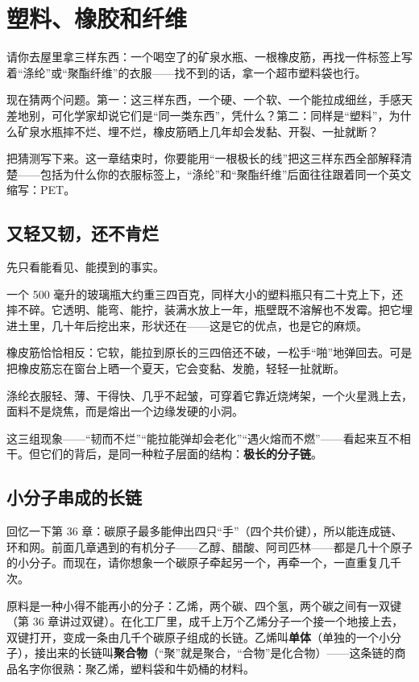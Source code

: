 \chapter{塑料、橡胶和纤维}

\begin{kaichang}
请你去屋里拿三样东西：一个喝空了的矿泉水瓶、一根橡皮筋，再找一件标签上写着“涤纶”或“聚酯纤维”的衣服——找不到的话，拿一个超市塑料袋也行。

现在猜两个问题。第一：这三样东西，一个硬、一个软、一个能拉成细丝，手感天差地别，可化学家却说它们是“同一类东西”，凭什么？第二：同样是“塑料”，为什么矿泉水瓶摔不烂、埋不烂，橡皮筋晒上几年却会发黏、开裂、一扯就断？

把猜测写下来。这一章结束时，你要能用“一根极长的线”把这三样东西全部解释清楚——包括为什么你的衣服标签上，“涤纶”和“聚酯纤维”后面往往跟着同一个英文缩写：PET。
\end{kaichang}

\section{又轻又韧，还不肯烂}

先只看能看见、能摸到的事实。

一个 500 毫升的玻璃瓶大约重三四百克，同样大小的塑料瓶只有二十克上下，还摔不碎。它透明、能弯、能拧，装满水放上一年，瓶壁既不溶解也不发霉。把它埋进土里，几十年后挖出来，形状还在——这是它的优点，也是它的麻烦。

橡皮筋恰恰相反：它软，能拉到原长的三四倍还不破，一松手“啪”地弹回去。可是把橡皮筋忘在窗台上晒一个夏天，它会变黏、发脆，轻轻一扯就断。

涤纶衣服轻、薄、干得快、几乎不起皱，可穿着它靠近烧烤架，一个火星溅上去，面料不是烧焦，而是熔出一个边缘发硬的小洞。

这三组现象——“韧而不烂”“能拉能弹却会老化”“遇火熔而不燃”——看起来互不相干。但它们的背后，是同一种粒子层面的结构：\textbf{极长的分子链}。

\section{小分子串成的长链}

回忆一下第 36 章：碳原子最多能伸出四只“手”（四个共价键），所以能连成链、环和网。前面几章遇到的有机分子——乙醇、醋酸、阿司匹林——都是几十个原子的小分子。而现在，请你想象一个碳原子牵起另一个，再牵一个，一直重复几千次。

原料是一种小得不能再小的分子：乙烯，两个碳、四个氢，两个碳之间有一双键（第 36 章讲过双键）。在化工厂里，成千上万个乙烯分子一个接一个地接上去，双键打开，变成一条由几千个碳原子组成的长链。乙烯叫\textbf{单体}（单独的一个小分子），接出来的长链叫\textbf{聚合物}（“聚”就是聚合，“合物”是化合物）——这条链的商品名字你很熟：聚乙烯，塑料袋和牛奶桶的材料。

